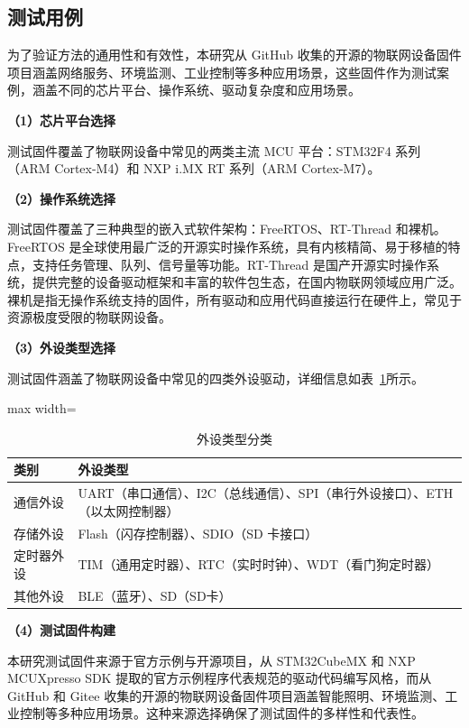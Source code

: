 \subsection{测试用例}

为了验证方法的通用性和有效性，本研究从 GitHub 收集的开源的物联网设备固件项目涵盖网络服务、环境监测、工业控制等多种应用场景，这些固件作为测试案例，涵盖不同的芯片平台、操作系统、驱动复杂度和应用场景。

\textbf{（1）芯片平台选择}

测试固件覆盖了物联网设备中常见的两类主流 MCU 平台：STM32F4 系列（ARM Cortex-M4）和 NXP i.MX RT 系列（ARM Cortex-M7）。

\textbf{（2）操作系统选择}

测试固件覆盖了三种典型的嵌入式软件架构：FreeRTOS、RT-Thread 和裸机。FreeRTOS 是全球使用最广泛的开源实时操作系统，具有内核精简、易于移植的特点，支持任务管理、队列、信号量等功能。RT-Thread 是国产开源实时操作系统，提供完整的设备驱动框架和丰富的软件包生态，在国内物联网领域应用广泛。裸机是指无操作系统支持的固件，所有驱动和应用代码直接运行在硬件上，常见于资源极度受限的物联网设备。

\textbf{（3）外设类型选择}

测试固件涵盖了物联网设备中常见的四类外设驱动，详细信息如表~\ref{tab:peripherals}所示。

\begin{table}[htbp]
\centering
\caption{外设类型分类}
\label{tab:peripherals}
\begin{adjustbox}{max width=\textwidth}
\begin{tabular}{ll}
\toprule
\textbf{类别} & \textbf{外设类型} \\
\midrule
通信外设 & UART（串口通信）、I2C（总线通信）、SPI（串行外设接口）、ETH（以太网控制器） \\
存储外设 & Flash（闪存控制器）、SDIO（SD 卡接口） \\
定时器外设 & TIM（通用定时器）、RTC（实时时钟）、WDT（看门狗定时器） \\
其他外设 & BLE（蓝牙）、SD（SD卡） \\
\bottomrule
\end{tabular}
\end{adjustbox}
\end{table}

\textbf{（4）测试固件构建}

本研究测试固件来源于官方示例与开源项目，从 STM32CubeMX 和 NXP MCUXpresso SDK 提取的官方示例程序代表规范的驱动代码编写风格，而从 GitHub 和 Gitee 收集的开源的物联网设备固件项目涵盖智能照明、环境监测、工业控制等多种应用场景。这种来源选择确保了测试固件的多样性和代表性。

